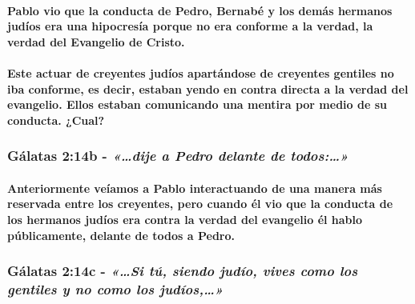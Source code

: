\documentclass[11a pt,twoside]{article}
\newcommand{\scripture}[1]{%
  {\fontsize{12pt}{16pt}\selectfont\ScriptureFont\itshape #1}%
}
\let\oldsubsubsection\subsubsection
\renewcommand{\subsubsection}{\needspace{4\baselineskip}\oldsubsubsection}
\let\oldparagraph\paragraph
\renewcommand{\paragraph}{\needspace{3\baselineskip}\oldparagraph}
\begin{document}
\paragraph{Pablo vio que la conducta de Pedro, Bernabé y los demás
hermanos judíos era una hipocresía porque no era conforme a la verdad,
la verdad del Evangelio de
Cristo.}\label{pablo-vio-que-la-conducta-de-pedro-bernabuxe9-y-los-demuxe1s-hermanos-juduxedos-era-una-hipocresuxeda-porque-no-era-conforme-a-la-verdad-la-verdad-del-evangelio-de-cristo.}

\paragraph{Este actuar de creyentes judíos apartándose de creyentes
gentiles no iba conforme, es decir, estaban yendo en contra directa a la
verdad del evangelio. Ellos estaban comunicando una mentira por medio de
su conducta.
¿Cual?}\label{este-actuar-de-creyentes-juduxedos-apartuxe1ndose-de-creyentes-gentiles-no-iba-conforme-es-decir-estaban-yendo-en-contra-directa-a-la-verdad-del-evangelio.-ellos-estaban-comunicando-una-mentira-por-medio-de-su-conducta.-cual}

\subsubsection{\texorpdfstring{Gálatas 2:14b -
\scripture{«…dije a Pedro delante de todos:…»}}{Gálatas 2:14b - }}\label{guxe1latas-214b---dije-a-pedro-delante-de-todos}

\paragraph{Anteriormente veíamos a Pablo interactuando de una manera más
reservada entre los creyentes, pero cuando él vio que la conducta de los
hermanos judíos era contra la verdad del evangelio él hablo
públicamente, delante de todos a
Pedro.}\label{anteriormente-veuxedamos-a-pablo-interactuando-de-una-manera-muxe1s-reservada-entre-los-creyentes-pero-cuando-uxe9l-vio-que-la-conducta-de-los-hermanos-juduxedos-era-contra-la-verdad-del-evangelio-uxe9l-hablo-puxfablicamente-delante-de-todos-a-pedro.}

\subsubsection{\texorpdfstring{Gálatas 2:14c -
\scripture{«…Si tú, siendo judío, vives como los gentiles y no como los judíos,…»}}{Gálatas 2:14c - }}\label{guxe1latas-214c---si-tuxfa-siendo-juduxedo-vives-como-los-gentiles-y-no-como-los-juduxedos}
\end{document}
